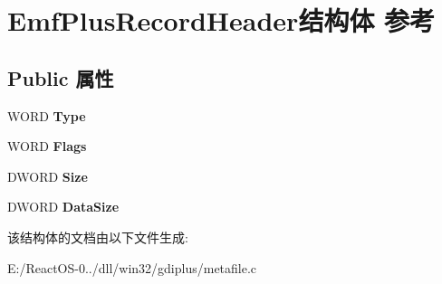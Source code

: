 \hypertarget{struct_emf_plus_record_header}{}\section{Emf\+Plus\+Record\+Header结构体 参考}
\label{struct_emf_plus_record_header}
\subsection*{Public 属性}
\begin{DoxyCompactItemize}
\item 
\mbox{\label{struct_emf_plus_record_header_a3ae38f840969a38346d71e2fec3c5ab0}} 
W\+O\+RD {\bfseries Type}
\item 
\mbox{\label{struct_emf_plus_record_header_ab00fa5800df17c21d0ca92509b41df88}} 
W\+O\+RD {\bfseries Flags}
\item 
\mbox{\label{struct_emf_plus_record_header_af0bf0d716a06b099bec9392301371125}} 
D\+W\+O\+RD {\bfseries Size}
\item 
\mbox{\label{struct_emf_plus_record_header_aef6b98388cd87f3e427ce6c6949dacd7}} 
D\+W\+O\+RD {\bfseries Data\+Size}
\end{DoxyCompactItemize}


该结构体的文档由以下文件生成\+:\begin{DoxyCompactItemize}
\item 
E\+:/\+React\+O\+S-\/0../dll/win32/gdiplus/metafile.\+c\end{DoxyCompactItemize}

